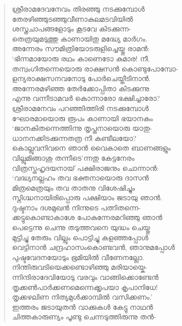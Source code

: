 \begin{verse}
ശ്രീരാമദേവനേവം തിരഞ്ഞു നടക്കുമ്പോള്‍\\
തേരഴിഞ്ഞുടഞ്ഞുവീണാകുലമടവിയില്‍\\
ശസ്ത്രചാപങ്ങളോടും കൂടവേ കിടക്കുന്ന-\\
തെത്രയുമടുത്തു കാണായിതു മദ്ധ്യേ മാര്‍ഗം.\\
അന്നേരം സൗമിത്രിയോടരുളിച്ചെയ്തു രാമന്‍:\\
‘ഭിന്നമായോരു രഥം കാണെടോ കുമാര! നീ.\\
തന്വംഗിതന്നെയൊരു രാക്ഷസന്‍ കൊണ്ടുപോമ്പോ-\\
ളന്യരാക്ഷസനവനോടു പോര്‍ചെയ്തീടിനാന്‍.\\
അന്നേരമഴിഞ്ഞ തേര്‍ക്കോപ്പിതാ കിടക്കുന്നു\\
എന്നു വന്നീടാമവര്‍ കൊന്നാരോ ഭക്ഷിച്ചാരോ?\\
ശ്രീരാമനേവം പറഞ്ഞിത്തിരി നടക്കുമ്പോള്‍\\
ഘോരമായൊരു രൂപം കാണായി ഭയാനകം\\
‘ജാനകിതന്നെത്തിന്നു തൃപ്തനായൊരു യാതു-\\
ധാനനക്കിടക്കുന്നതത്ര നീ കണ്ടീലയോ?\\
കൊല്ലുവനിവനെ ഞാന്‍ വൈകാതെ ബാണങ്ങളും\\
വില്ലുമിങ്ങാശു തന്നീടെ’ന്നതു കേട്ടനേരം\\
വിത്രസ്തഹൃദയനായ് പക്ഷിരാജനും ചൊന്നാന്‍:\\
‘വദ്ധ്യനല്ലഹം തവ ഭക്തനായൊരു ദാസന്‍\\
മിത്രമെത്രയും തവ താതനു വിശേഷിച്ചും\\
സ്നിഗ്ദ്ധനായിരിപ്പൊരു പക്ഷിയാം ജടായു ഞാന്‍.\\
ദുഷ്ടനാം ദശമുഖന്‍ നിന്നുടെ പത്നിതന്നെ-\\
ക്കട്ടുകൊണ്ടാകാശേ പോകുന്നേരമറിഞ്ഞു ഞാന്‍\\
പെട്ടെന്നു ചെന്നു തടുത്തവനെ യുദ്ധം ചെയ്തു\\
മുട്ടിച്ചു തേരും വില്ലും പൊട്ടിച്ചു കളഞ്ഞപ്പോള്‍\\
വെട്ടിനാന്‍ ചന്ദ്രഹാസംകൊണ്ടവന്‍, ഞാനുമപ്പോള്‍\\
പുഷ്ടവേദനയോടും ഭൂമിയില്‍ വീണേനല്ലോ.\\
നിന്തിരുവടിയെക്കണ്ടൊഴിഞ്ഞു മരിയായ്കെ-\\
ന്നിന്ദിരാദേവിയോടു വരവും വാങ്ങിക്കൊണ്ടേന്‍\\
തൃക്കണ്‍പാര്‍ക്കണമെന്നെക്കൃപയാ കൃപാനിധേ!\\
തൃക്കഴലിണ നിത്യമുള്‍ക്കാമ്പില്‍ വസിക്കണം.’\\
ഇത്തരം ജടായുതന്‍ വാക്കുകള്‍ കേട്ടു നാഥന്‍\\
ചിത്തകാരുണ്യം പൂണ്ടു ചെന്നടുത്തിരുന്നു തന്‍-\\

\end{verse}
